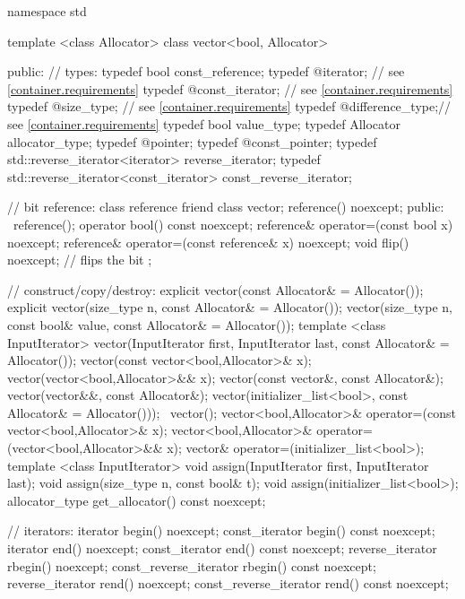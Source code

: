 \begin{codeblock}
namespace std {
  template <class Allocator> class vector<bool, Allocator> {
  public:
    // types:
    typedef bool                                  const_reference;
    typedef @\impdef@                iterator;       // see \ref{container.requirements}
    typedef @\impdef@                const_iterator; // see \ref{container.requirements}
    typedef @\impdef@                size_type;      // see \ref{container.requirements}
    typedef @\impdef@                difference_type;// see \ref{container.requirements}
    typedef bool                                  value_type;
    typedef Allocator                             allocator_type;
    typedef @\impdef@                pointer;
    typedef @\impdef@                const_pointer;
    typedef std::reverse_iterator<iterator>       reverse_iterator;
    typedef std::reverse_iterator<const_iterator> const_reverse_iterator;

    // bit reference:
    class reference {
      friend class vector;
      reference() noexcept;
    public:
      ~reference();
      operator bool() const noexcept;
      reference& operator=(const bool x) noexcept;
      reference& operator=(const reference& x) noexcept;
      void flip() noexcept;     // flips the bit
    };

    // construct/copy/destroy:
    explicit vector(const Allocator& = Allocator());
    explicit vector(size_type n, const Allocator& = Allocator());
    vector(size_type n, const bool& value,
           const Allocator& = Allocator());
    template <class InputIterator>
      vector(InputIterator first, InputIterator last,
             const Allocator& = Allocator());
    vector(const vector<bool,Allocator>& x);
    vector(vector<bool,Allocator>&& x);
    vector(const vector&, const Allocator&);
    vector(vector&&, const Allocator&);
    vector(initializer_list<bool>, const Allocator& = Allocator()));
   ~vector();
    vector<bool,Allocator>& operator=(const vector<bool,Allocator>& x);
    vector<bool,Allocator>& operator=(vector<bool,Allocator>&& x);
    vector& operator=(initializer_list<bool>);
    template <class InputIterator>
      void assign(InputIterator first, InputIterator last);
    void assign(size_type n, const bool& t);
    void assign(initializer_list<bool>);
    allocator_type get_allocator() const noexcept;

    // iterators:
    iterator               begin() noexcept;
    const_iterator         begin() const noexcept;
    iterator               end() noexcept;
    const_iterator         end() const noexcept;
    reverse_iterator       rbegin() noexcept;
    const_reverse_iterator rbegin() const noexcept;
    reverse_iterator       rend() noexcept;
    const_reverse_iterator rend() const noexcept;

}}
\end{codeblock}
